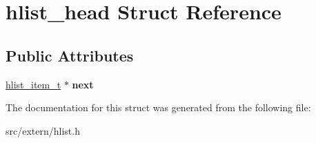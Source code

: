 \hypertarget{structhlist__head}{\section{hlist\-\_\-head Struct Reference}
\label{structhlist__head}
}
\subsection*{Public Attributes}
\begin{DoxyCompactItemize}
\item 
\hypertarget{structhlist__head_aa5596c5f17b46608d309c6071224b27a}{\hyperlink{structhlist__item}{hlist\-\_\-item\-\_\-t} $\ast$ {\bfseries next}}\label{structhlist__head_aa5596c5f17b46608d309c6071224b27a}

\end{DoxyCompactItemize}


The documentation for this struct was generated from the following file\-:\begin{DoxyCompactItemize}
\item 
src/extern/hlist.\-h\end{DoxyCompactItemize}

